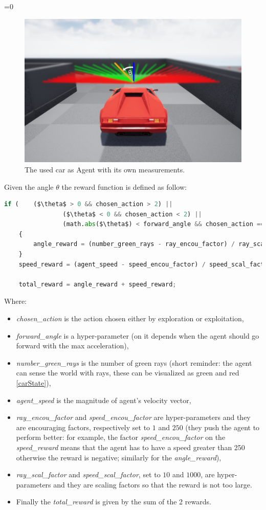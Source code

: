 \documentclass[14pt]{extarticle}
\newcounter{debug}
\begin{document}
\begin{flushleft}
\ifnum\value{debug}=0 {
\begin{figure}[H] \label{carAngle}
    		\centering\includegraphics[width=1\textwidth]{./Image/RF/carAngle2.png}
		\vspace{2mm}
    		\caption{The used car as Agent with its own measurements.}
	\end{figure}
} \fi
	Given the angle $\theta$ the reward function is defined as follow:
\begin{lstlisting}[mathescape=true, language=Python]
	if (	($\theta$ > 0 && chosen_action > 2) ||
				($\theta$ < 0 && chosen_action < 2) ||
				(math.abs($\theta$) < forward_angle && chosen_action == 2))
	{
		angle_reward = (number_green_rays - ray_encou_factor) / ray_scal_factor;
	}
	speed_reward = (agent_speed - speed_encou_factor) / speed_scal_factor;
	
	total_reward = angle_reward + speed_reward;
\end{lstlisting}
	Where:
	\begin{itemize}
	\item \emph{chosen\_action} is the action chosen either by exploration or exploitation,
	\item \emph{forward\_angle} is a hyper-parameter (on it depends when the agent should go forward with the max acceleration),
	\item \emph{number\_green\_rays} is the number of green rays (short reminder: the agent can sense the world with rays, these can be visualized as green and red \ref{carState}),
	\item \emph{agent\_speed} is the magnitude of agent's velocity vector, 
	\item \emph{ray\_encou\_factor} and \emph{speed\_encou\_factor} are hyper-parameters and they are encouraging factors, respectively set to $1$ and $250$ (they push the agent to perform better: for example, the factor \emph{speed\_encou\_factor} on the \emph{speed\_reward} means that the agent has to have a speed greater than 250 otherwise the reward is negative; similarly for the \emph{angle\_reward}), 
\item \emph{ray\_scal\_factor} and \emph{speed\_scal\_factor}, set to $10$ and $1000$, are hyper-parameters and they are scaling factors so that the reward is not too large.
\item Finally the \emph{total\_reward} is given by the sum of the 2 rewards.
	\end{itemize}
	

\end{flushleft}
\end{document}
